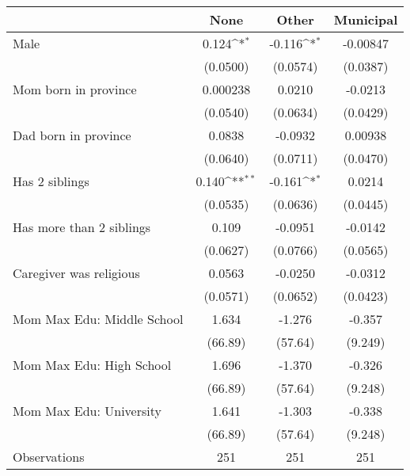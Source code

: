 {
\def\sym#1{\ifmmode^{#1}\else\(^{#1}\)\fi}
\begin{tabular}{l*{3}{c}}
\toprule
                    &\multicolumn{1}{c}{None}&\multicolumn{1}{c}{Other}&\multicolumn{1}{c}{Municipal}\\
\midrule
Male                &       0.124\sym{*}  &      -0.116\sym{*}  &    -0.00847         \\
                    &    (0.0500)         &    (0.0574)         &    (0.0387)         \\
\addlinespace
Mom born in province&    0.000238         &      0.0210         &     -0.0213         \\
                    &    (0.0540)         &    (0.0634)         &    (0.0429)         \\
\addlinespace
Dad born in province&      0.0838         &     -0.0932         &     0.00938         \\
                    &    (0.0640)         &    (0.0711)         &    (0.0470)         \\
\addlinespace
Has 2 siblings      &       0.140\sym{**} &      -0.161\sym{*}  &      0.0214         \\
                    &    (0.0535)         &    (0.0636)         &    (0.0445)         \\
\addlinespace
Has more than 2 siblings&       0.109         &     -0.0951         &     -0.0142         \\
                    &    (0.0627)         &    (0.0766)         &    (0.0565)         \\
\addlinespace
Caregiver was religious&      0.0563         &     -0.0250         &     -0.0312         \\
                    &    (0.0571)         &    (0.0652)         &    (0.0423)         \\
\addlinespace
Mom Max Edu: Middle School&       1.634         &      -1.276         &      -0.357         \\
                    &     (66.89)         &     (57.64)         &     (9.249)         \\
\addlinespace
Mom Max Edu: High School&       1.696         &      -1.370         &      -0.326         \\
                    &     (66.89)         &     (57.64)         &     (9.248)         \\
\addlinespace
Mom Max Edu: University&       1.641         &      -1.303         &      -0.338         \\
                    &     (66.89)         &     (57.64)         &     (9.248)         \\
\midrule
Observations        &         251         &         251         &         251         \\
\bottomrule
\end{tabular}
}
